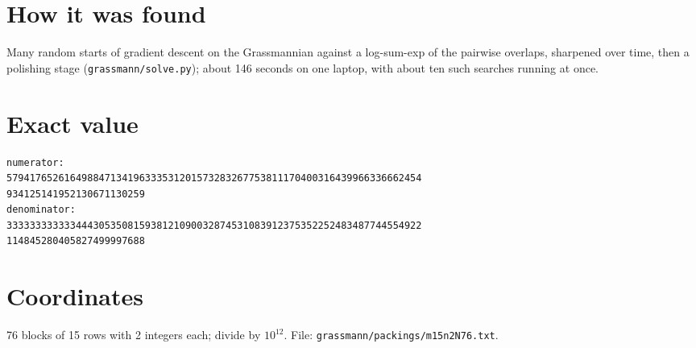 \documentclass[11pt,a4paper]{article}
\begin{document}
\section{How it was found}
Many random starts of gradient descent on the Grassmannian against a log-sum-exp of the pairwise overlaps, sharpened over time, then a polishing stage (\texttt{grassmann/solve.py}); about 146 seconds on one laptop, with about ten such searches running at once.


\appendix
\section{Exact value}
{\small
\begin{verbatim}
numerator:
579417652616498847134196333531201573283267753811170400316439966336662454
934125141952130671130259
denominator:
333333333333444305350815938121090032874531083912375352252483487744554922
114845280405827499997688
\end{verbatim}}

\section{Coordinates}
76 blocks of 15 rows with 2 integers each; divide by $10^{12}$. File: \texttt{grassmann/packings/m15n2N76.txt}.
{\tiny
\begin{multicols}{4}
\end{multicols}}
\end{document}

